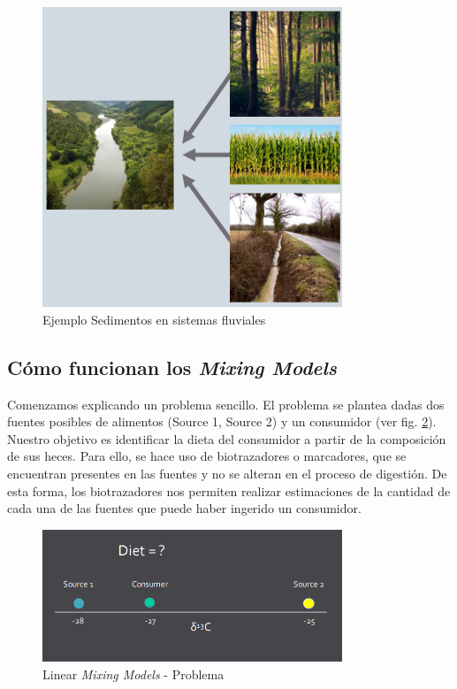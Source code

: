 \begin{figure}[h!] 
\centering
    \includegraphics[width=0.8\textwidth]{img/soilSediment.PNG}
\caption{Ejemplo Sedimentos en sistemas fluviales }
\label{fig:soilSediment}
\end{figure}


\clearpage

\subsection{Cómo funcionan los \emph{Mixing Models}}

Comenzamos explicando un problema sencillo. El problema se plantea dadas dos fuentes posibles de alimentos (Source 1, Source 2) y un consumidor (ver fig. \ref{fig:workMixing0}). Nuestro objetivo es identificar la dieta del consumidor a partir de la composición de sus heces. Para ello, se hace uso de biotrazadores o marcadores, que se encuentran presentes en las fuentes y no se alteran en el proceso de digestión. De esta forma, los biotrazadores nos permiten realizar estimaciones de la cantidad de cada una de las fuentes que puede haber ingerido un consumidor. 

\begin{figure}[h!] 
\centering
    \includegraphics[width=0.8\textwidth]{img/workMixing0.PNG}
\caption{Linear \emph{Mixing Models} - Problema }
\label{fig:workMixing0}
\end{figure}

